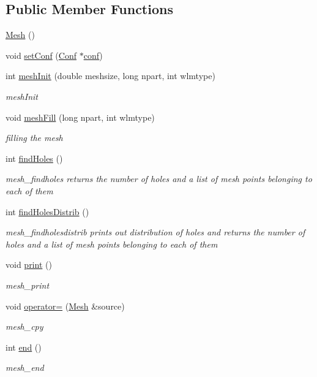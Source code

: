 \subsection*{Public Member Functions}
\begin{DoxyCompactItemize}
\item 
\hyperlink{class_mesh_a2af137f1571af89172b9c102302c416b}{Mesh} ()
\item 
void \hyperlink{class_mesh_add86daba06ee8291c7908f4a1d5070b6}{set\+Conf} (\hyperlink{class_conf}{Conf} $\ast$\hyperlink{class_mesh_aea779b6c0ade9b15e724306f0a4652de}{conf})
\item 
int \hyperlink{class_mesh_a086d2a79604a0636b39d4d07c516867e}{mesh\+Init} (double meshsize, long npart, int wlmtype)
\begin{DoxyCompactList}\small\item\em mesh\+Init \end{DoxyCompactList}\item 
void \hyperlink{class_mesh_a287954614a974377a6adba50692158b8}{mesh\+Fill} (long npart, int wlmtype)
\begin{DoxyCompactList}\small\item\em filling the mesh \end{DoxyCompactList}\item 
int \hyperlink{class_mesh_ae1c06bc8b428ea8d854513b4ccf120cd}{find\+Holes} ()
\begin{DoxyCompactList}\small\item\em mesh\+\_\+findholes returns the number of holes and a list of mesh points belonging to each of them \end{DoxyCompactList}\item 
int \hyperlink{class_mesh_af373f0167a41061f4aa0f2741cb02da0}{find\+Holes\+Distrib} ()
\begin{DoxyCompactList}\small\item\em mesh\+\_\+findholesdistrib prints out distribution of holes and returns the number of holes and a list of mesh points belonging to each of them \end{DoxyCompactList}\item 
void \hyperlink{class_mesh_af5a35e846fe102b2b2c0232baf83f6cf}{print} ()
\begin{DoxyCompactList}\small\item\em mesh\+\_\+print \end{DoxyCompactList}\item 
void \hyperlink{class_mesh_a0c233a05716e43a7014f6346cc79d118}{operator=} (\hyperlink{class_mesh}{Mesh} \&source)
\begin{DoxyCompactList}\small\item\em mesh\+\_\+cpy \end{DoxyCompactList}\item 
int \hyperlink{class_mesh_a43ba112d0301e5e8dd9ccc31c2e2db86}{end} ()
\begin{DoxyCompactList}\small\item\em mesh\+\_\+end \end{DoxyCompactList}\end{DoxyCompactItemize}
